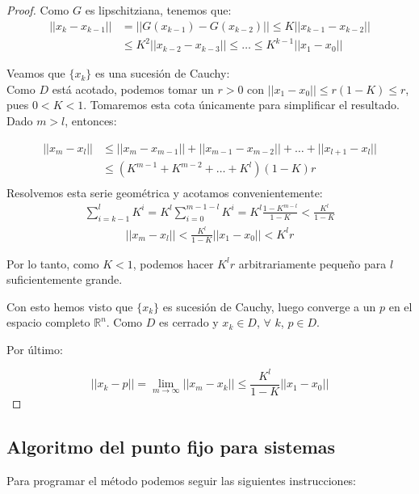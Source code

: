 \begin{proof}
	Como $G$ es lipschitziana, tenemos que:
	\begin{align*}
	|| x_{k} - x_{k-1} || & = || G(x_{k-1}) - G(x_{k-2}) || \leq K || x_{k-1} - x_{k-2} || \\
	& \leq K^2|| x_{k-2} -  x_{k-3} || \leq \ldots \leq K^{k-1}|| x_{1} - x_{0} ||
	\end{align*}

	Veamos que $\{x_{k}\}$ es una sucesión de Cauchy: \\
 	Como $D$ está acotado, podemos tomar un $r > 0$ con $||x_{1} - x_{0}||\leq r(1-K) \leq r$, pues $0 < K < 1$. Tomaremos esta cota únicamente para simplificar el resultado. \\
 	Dado $m>l$, entonces:

	\begin{align*}
	||x_{m}-x_{l}||& \leq ||x_{m} - x_{m-1}|| + ||x_{m-1} - x_{m-2}|| +  \ldots+||x_{l+1} -  x_{l}||\\
	& \leq (K^{m-1} + K^{m-2} + \ldots + K^l) (1-K)r \\
	\end{align*}
	Resolvemos esta serie geométrica y acotamos convenientemente:
	\begin{align*}
	\sum_{i = k-1}^{l} K^{i} = K^{l} \sum_{i = 0}^{m-1-l} K^{i} = K^{l}\frac{1-K^{m-l}}{1-K} < \frac{K^{l}}{1-K}
	\end{align*}
	\begin{align*}
	||x_{m}-x_{l}|| < \frac{K^{l}}{1-K} ||x_{1}-x_{0}|| < K^{l} r
	\end{align*}

	Por lo tanto, como $K<1$, podemos hacer $K^lr$ arbitrariamente pequeño para $l$ suficientemente grande.
	
	Con esto hemos visto que $\{x_{k}\}$ es sucesión de Cauchy, luego converge a un $p$ en el espacio completo $\mathbb{R}^{n}$. Como $D$ es cerrado y $x_{k} \in D$, $\forall$ $k$, $p \in D$.
	
	Por último:
	
	\[||x_{k}-p|| = \lim_{m \to \infty} ||x_{m}-x_{k}|| \leq \frac{K^l}{1-K}||x_{1}-x_{0}||\]
\end{proof}

\subsection{Algoritmo del punto fijo para sistemas}

Para programar el método podemos seguir las siguientes instrucciones: 


